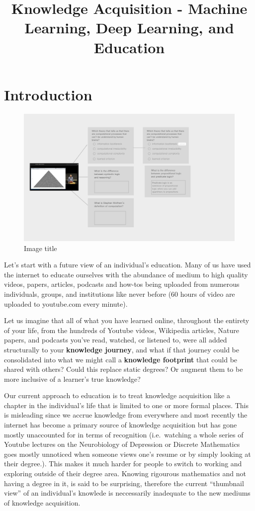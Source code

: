 \documentclass{acm_proc_article-sp}
\title{Knowledge Acquisition - Machine Learning, Deep Learning, and Education}
\author{
\alignauthor Fanli (Christian) Zheng \\
        \affaddr{dyad x machina}\\
       \email{\href{mailto:thechristianramsey@gmail.com}{\nolinkurl{thechristianramsey@gmail.com}}}
\and \alignauthor Haohan Wang \\
        \affaddr{dyad x machina}\\
       \email{\href{mailto:haohan723@gmail.com}{\nolinkurl{haohan723@gmail.com}}}
\and }
\date{}
\begin{document}
\maketitle


\section{Introduction}\label{introduction}

\begin{figure}
\centering
\includegraphics{img/MtoQA.png}
\caption{Image title}
\end{figure}

Let's start with a future view of an individual's education. Many of us
have used the internet to educate ourselves with the abundance of medium
to high quality videos, papers, articles, podcasts and how-tos being
uploaded from numerous individuals, groups, and institutions like never
before (60 hours of video are uploaded to youtube.com every minute).

Let us imagine that all of what you have learned online, throughout the
entirety of your life, from the hundreds of Youtube videos, Wikipedia
articles, Nature papers, and podcasts you've read, watched, or listened
to, were all added structurally to your \textbf{knowledge journey}, and
what if that journey could be consolidated into what we might call a
\textbf{knowledge footprint} that could be shared with others? Could
this replace static degrees? Or augment them to be more inclusive of a
learner's true knowledge?

Our current approach to education is to treat knowledge acquisition like
a chapter in the individual's life that is limited to one or more formal
places. This is misleading since we accrue knowledge from everywhere and
most recently the internet has become a primary source of knowledge
acquisition but has gone mostly unaccounted for in terms of recognition
(i.e.~watching a whole series of Youtube lectures on the Neurobiology of
Depression or Discrete Mathematics goes mostly unnoticed when someone
views one's resume or by simply looking at their degree.). This makes it
much harder for people to switch to working and exploring outside of
their degree area. Knowing rigourous mathematics and not having a degree
in it, is said to be surprising, therefore the current ``thumbnail
view'' of an individual's knowlede is neccessarily inadequate to the new
mediums of knowledge acquisition.
\end{document}
